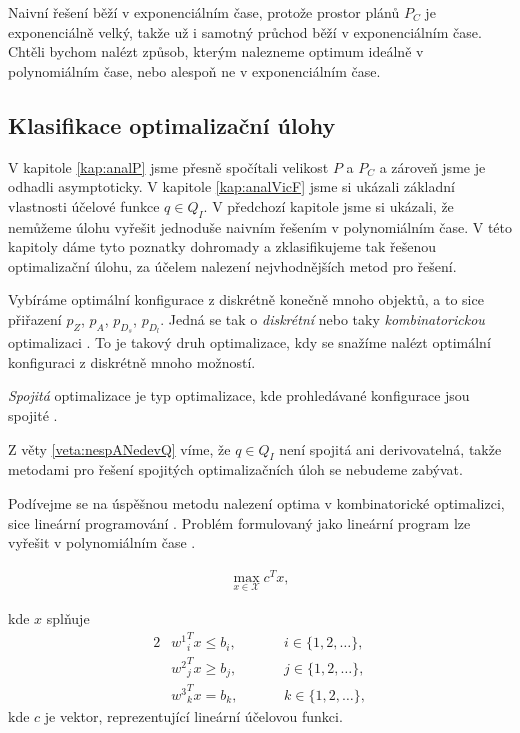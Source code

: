 Naivní řešení běží v exponenciálním čase, protože prostor plánů $P_C$ je exponenciálně velký, takže už i samotný průchod běží v exponenciálním čase.
Chtěli bychom nalézt způsob, kterým nalezneme optimum ideálně v polynomiálním čase, nebo alespoň ne v exponenciálním čase.

\subsection{Klasifikace optimalizační úlohy}\label{kap:NP}

V kapitole \ref{kap:analP} jsme přesně spočítali velikost $P$ a $P_C$ a zároveň jsme je odhadli asymptoticky.
V kapitole \ref{kap:analVicF} jsme si ukázali základní vlastnosti účelové funkce $q \in Q_I$.
V předchozí kapitole jsme si ukázali, že nemůžeme úlohu vyřešit jednoduše naivním řešením v polynomiálním čase.
V této kapitoly dáme tyto poznatky dohromady a zklasifikujeme tak řešenou optimalizační úlohu, za účelem nalezení nejvhodnějších metod pro řešení.

Vybíráme optimální konfigurace z diskrétně konečně mnoho objektů, a to sice přiřazení $p_Z$, $p_A$, $p_{D_{s}}$, $p_{D_{l}}$.
Jedná se tak o \textit{diskrétní} nebo taky \textit{kombinatorickou} optimalizaci \cite{discrete}.
To je takový druh optimalizace, kdy se snažíme nalézt optimální konfiguraci z diskrétně mnoho možností.

\textit{Spojitá} optimalizace je typ optimalizace, kde prohledávané konfigurace jsou spojité \cite{continuos}.

Z věty \ref{veta:nespANedevQ} víme, že $q \in Q_I$ není spojitá ani derivovatelná, takže metodami pro řešení spojitých optimalizačních úloh se nebudeme zabývat.

Podívejme se na úspěšnou metodu nalezení optima v kombinatorické optimalizci, sice lineární programování \cite{LP}.
Problém formulovaný jako lineární program lze vyřešit v polynomiálním čase \cite{cohen2020solving}.

\begin{definice}
  \begin{align*}
    \max_{x \in \mathcal{X}} c^T x,
  \end{align*}

  kde $x$ splňuje
  \begin{alignat*}{2}
    & {w^1}^T_i x \leq b_i, && \hspace{20pt} i \in \{ 1, 2, \dots \},\\
    & {w^2}^T_j x \geq b_j, && \hspace{20pt} j \in \{ 1, 2, \dots \},\\
    & {w^3}^T_k x = b_k,    && \hspace{20pt} k \in \{ 1, 2, \dots \},
  \end{alignat*}
  kde $c$ je vektor, reprezentující lineární účelovou funkci.
\end{definice}


